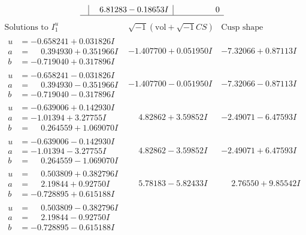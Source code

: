 \documentclass[1p]{elsarticle_modified}
\theoremstyle{definition}
\newcommand{\I}{\sqrt{-1}}
\begin{document}
$$\begin{array}{c|c|c}
 & \phantom{-}6.81283 - 0.18653 I & \phantom{-0.000000 } 0\\
 \hline 
 \end{array}$$\newpage$$\begin{array}{c|c|c}  
\text{Solutions to }I^u_{1}& \I (\text{vol} + \sqrt{-1}CS) & \text{Cusp shape}\\
 \hline 
\begin{aligned}
u &= -0.658241 + 0.031826 I \\
a &= \phantom{-}0.394930 + 0.351966 I \\
b &= -0.719040 + 0.317896 I\end{aligned}
 & -1.407700 + 0.051950 I & -7.32066 + 0.87113 I \\ \hline\begin{aligned}
u &= -0.658241 - 0.031826 I \\
a &= \phantom{-}0.394930 - 0.351966 I \\
b &= -0.719040 - 0.317896 I\end{aligned}
 & -1.407700 - 0.051950 I & -7.32066 - 0.87113 I \\ \hline\begin{aligned}
u &= -0.639006 + 0.142930 I \\
a &= -1.01394 + 3.27755 I \\
b &= \phantom{-}0.264559 + 1.069070 I\end{aligned}
 & \phantom{-}4.82862 + 3.59852 I & -2.49071 - 6.47593 I \\ \hline\begin{aligned}
u &= -0.639006 - 0.142930 I \\
a &= -1.01394 - 3.27755 I \\
b &= \phantom{-}0.264559 - 1.069070 I\end{aligned}
 & \phantom{-}4.82862 - 3.59852 I & -2.49071 + 6.47593 I \\ \hline\begin{aligned}
u &= \phantom{-}0.503809 + 0.382796 I \\
a &= \phantom{-}2.19844 + 0.92750 I \\
b &= -0.728895 + 0.615188 I\end{aligned}
 & \phantom{-}5.78183 - 5.82433 I & \phantom{-}2.76550 + 9.85542 I \\ \hline\begin{aligned}
u &= \phantom{-}0.503809 - 0.382796 I \\
a &= \phantom{-}2.19844 - 0.92750 I \\
b &= -0.728895 - 0.615188 I\end{aligned}

\end{array}$$
\end{document}
